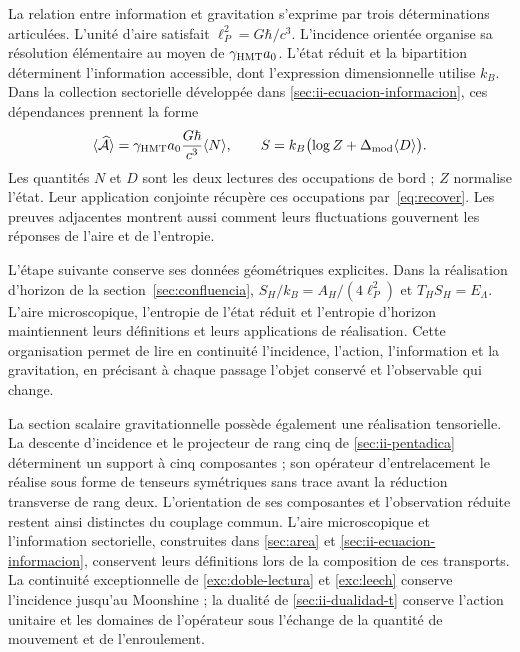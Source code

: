 La relation entre information et gravitation s'exprime par trois déterminations articulées. L'unité d'aire satisfait $\ell_P^2=G\hbar/c^3$. L'incidence orientée organise sa résolution élémentaire au moyen de $\gamma_{\mathrm{HMT}}a_0$. L'état réduit et la bipartition déterminent l'information accessible, dont l'expression dimensionnelle utilise $k_B$. Dans la collection sectorielle développée dans \ref{sec:ii-ecuacion-informacion}, ces dépendances prennent la forme
\begin{equation}
 \langle\widehat{\mathcal A}\rangle
 =\gamma_{\mathrm{HMT}}a_0\frac{G\hbar}{c^3}\langle N\rangle,
 \qquad
 S=k_B\bigl(\log Z+\Delta_{\rm mod}\langle D\rangle\bigr).
 \label{eq:ii-intro-area-informacion}
\end{equation}
Les quantités $N$ et $D$ sont les deux lectures des occupations de
bord ; $Z$ normalise l'état. Leur application conjointe récupère ces
occupations par~\eqref{eq:recover}. Les preuves adjacentes montrent
aussi comment leurs fluctuations gouvernent les réponses de l'aire et de
l'entropie.

L'étape suivante conserve ses données géométriques explicites. Dans la
réalisation d'horizon de la section~\ref{sec:confluencia},
$S_H/k_B=A_H/(4\ell_P^2)$ et $T_HS_H=E_\Lambda$.
L'aire microscopique, l'entropie de l'état réduit et l'entropie
d'horizon maintiennent leurs définitions et leurs applications de réalisation.
Cette organisation permet de lire en continuité l'incidence, l'action,
l'information et la gravitation, en précisant à chaque passage l'objet
conservé et l'observable qui change.

La section scalaire gravitationnelle possède également une réalisation tensorielle. La descente d'incidence et le projecteur de rang cinq de \ref{sec:ii-pentadica} déterminent un support à cinq composantes ; son opérateur d'entrelacement le réalise sous forme de tenseurs symétriques sans trace avant la réduction transverse de rang deux. L'orientation de ses composantes et l'observation réduite restent ainsi distinctes du couplage commun. L'aire microscopique et l'information sectorielle, construites dans \ref{sec:area} et \ref{sec:ii-ecuacion-informacion}, conservent leurs définitions lors de la composition de ces transports. La continuité exceptionnelle de \ref{exc:doble-lectura} et \ref{exc:leech} conserve l'incidence jusqu'au Moonshine ; la dualité de \ref{sec:ii-dualidad-t} conserve l'action unitaire et les domaines de l'opérateur sous l'échange de la quantité de mouvement et de l'enroulement.
